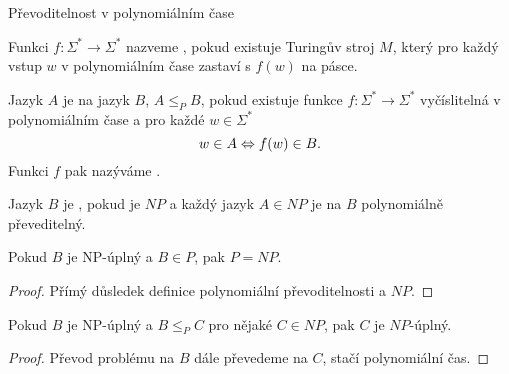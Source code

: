     
    
    
    
    \begin{frame}{Převoditelnost v polynomiálním čase}
    \begin{definition}
    Funkci $f: \Sigma^*\to \Sigma^*$ nazveme , pokud existuje Turingův stroj $M$, který pro každý vstup $w$ v polynomiálním čase zastaví s $f(w)$ na pásce.
    
    Jazyk $A$ je  na jazyk $B$, $A\leq_P B$, pokud existuje funkce $f: \Sigma^*\to \Sigma^*$ vyčíslitelná v polynomiálním čase a pro každé $w\in \Sigma^*$
    $$w\in A \Leftrightarrow f(w)\in B\hbox{.}
    $$
    Funkci $f$ pak nazýváme .
    \end{definition}
    
    \begin{definition}[$NP$ úplnost]
    Jazyk $B$ je , pokud je $NP$ a každý jazyk $A\in NP$ je na $B$ polynomiálně převeditelný.
    \end{definition}
    
    \end{frame}
    
    \begin{frame}{}
    \begin{theorem}
    Pokud $B$ je NP-úplný a $B\in P$, pak $P=NP$.
    \end{theorem}
    \begin{proof}
    Přímý důsledek definice polynomiální převoditelnosti a $NP$.
    \end{proof}
    \begin{theorem}
    Pokud $B$ je NP-úplný a $B\leq_P C$ pro nějaké $C\in NP$, pak $C$ je $NP$-úplný.
    \end{theorem}
    \begin{proof}
    Převod problému na $B$ dále převedeme na $C$, stačí polynomiální čas.
    \end{proof}
    
    
    \end{frame}
    
    
    
    
    
